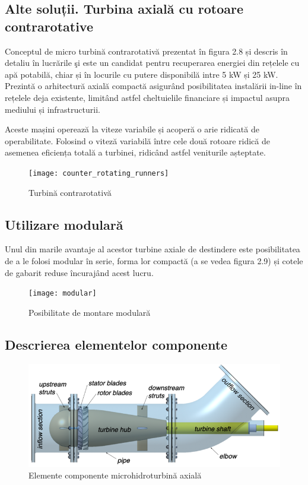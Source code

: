 \subsection{Alte soluții. Turbina axială cu rotoare contrarotative}

Conceptul de micro turbină contrarotativă prezentat în figura 2.8 și descris în detaliu în lucrările \cite{andolfatto2016simulation} \c{s}i \cite{andolfatto2015mixed} este un candidat pentru recuperarea energiei din rețelele cu apă potabilă, chiar și în locurile cu putere disponibilă intre 5 kW și 25 kW. Prezintă o arhitectură axială compactă asigurând posibilitatea instalării in-line în rețelele deja existente, limitând astfel cheltuielile financiare și impactul asupra mediului și infrastructurii.

Aceste mașini operează la viteze variabile și acoperă o arie ridicată de operabilitate. Folosind o viteză variabilă între cele două rotoare ridică de asemenea eficiența totală a turbinei, ridicând astfel veniturile așteptate.

\begin{figure}[h!]
	\centering
	\texttt{[image: counter\_rotating\_runners]}
	\caption{Turbină contrarotativă \protect\cite{andolfatto2016simulation}}
	\label{Turbină contrarotativă}
\end{figure}

\clearpage


\subsection{Utilizare modulară}
Unul din marile avantaje al acestor turbine axiale de destindere este posibilitatea de a le folosi modular în serie, forma lor compactă (a se vedea figura 2.9) și cotele de gabarit reduse încurajând acest lucru.

\begin{figure}[h!]
	\centering
	\texttt{[image: modular]}
	\caption{Posibilitate de montare modulară \protect\cite{hasmatuchi2014new}}
	\label{Posibilitate de montare modulară}
\end{figure}

\subsection{Descrierea elementelor componente}

\begin{figure}[h!]
	\centering
	\includegraphics[scale=0.7]{figures/assy-marked.png}
	\caption{Elemente componente microhidroturbină axială}
	\label{Elemente componente microhidroturbină axială}
\end{figure}

